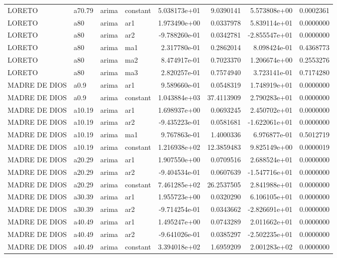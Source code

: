 \documentclass[
]{article}
\begin{document}
\begin{table}[!h]
\begin{tabular}[t]{llllrrrr}
LORETO & a70.79 & arima & constant & 5.038173e+01 & 9.0390141 & 5.573808e+00 & 0.0002361\\
LORETO & a80 & arima & ar1 & 1.973490e+00 & 0.0337978 & 5.839114e+01 & 0.0000000\\
LORETO & a80 & arima & ar2 & -9.788260e-01 & 0.0342781 & -2.855547e+01 & 0.0000000\\
\addlinespace
LORETO & a80 & arima & ma1 & 2.317780e-01 & 0.2862014 & 8.098424e-01 & 0.4368773\\
LORETO & a80 & arima & ma2 & 8.474917e-01 & 0.7023370 & 1.206674e+00 & 0.2553276\\
LORETO & a80 & arima & ma3 & 2.820257e-01 & 0.7574940 & 3.723141e-01 & 0.7174280\\
MADRE DE DIOS & a0.9 & arima & ar1 & 9.589660e-01 & 0.0548319 & 1.748919e+01 & 0.0000000\\
MADRE DE DIOS & a0.9 & arima & constant & 1.043884e+03 & 37.4113909 & 2.790283e+01 & 0.0000000\\
\addlinespace
MADRE DE DIOS & a10.19 & arima & ar1 & 1.698937e+00 & 0.0693245 & 2.450702e+01 & 0.0000000\\
MADRE DE DIOS & a10.19 & arima & ar2 & -9.435223e-01 & 0.0581681 & -1.622061e+01 & 0.0000000\\
MADRE DE DIOS & a10.19 & arima & ma1 & 9.767863e-01 & 1.4000336 & 6.976877e-01 & 0.5012719\\
MADRE DE DIOS & a10.19 & arima & constant & 1.216938e+02 & 12.3859483 & 9.825149e+00 & 0.0000019\\
MADRE DE DIOS & a20.29 & arima & ar1 & 1.907550e+00 & 0.0709516 & 2.688524e+01 & 0.0000000\\
\addlinespace
MADRE DE DIOS & a20.29 & arima & ar2 & -9.404534e-01 & 0.0607639 & -1.547716e+01 & 0.0000000\\
MADRE DE DIOS & a20.29 & arima & constant & 7.461285e+02 & 26.2537505 & 2.841988e+01 & 0.0000000\\
MADRE DE DIOS & a30.39 & arima & ar1 & 1.955723e+00 & 0.0320290 & 6.106105e+01 & 0.0000000\\
MADRE DE DIOS & a30.39 & arima & ar2 & -9.714254e-01 & 0.0343662 & -2.826691e+01 & 0.0000000\\
MADRE DE DIOS & a40.49 & arima & ar1 & 1.495247e+00 & 0.0743289 & 2.011662e+01 & 0.0000000\\
\addlinespace
MADRE DE DIOS & a40.49 & arima & ar2 & -9.641026e-01 & 0.0385297 & -2.502235e+01 & 0.0000000\\
MADRE DE DIOS & a40.49 & arima & constant & 3.394018e+02 & 1.6959209 & 2.001283e+02 & 0.0000000\\

\end{tabular}
\end{table}
\end{document}
